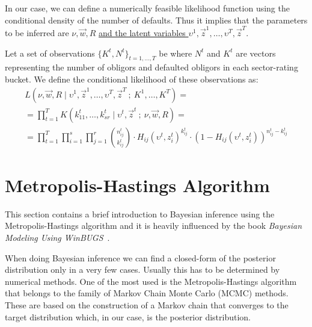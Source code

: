 \documentclass[11pt,fleqn]{book} %
\begin{document}
In our case, we can define a numerically feasible likelihood function using 
the conditional density of the number of defaults. Thus it implies that the 
parameters to be inferred are $\nu,\vec{w},R$ \ul{and the latent variables 
$\upsilon^1,\vec{z}^1,\dots,\upsilon^T,\vec{z}^T$}.

\begin{definition}
	Let a set of observations $\{K^t, N^t\}_{t=1,\dots,T}$ be where $N^t$ 
	and $K^t$ are vectors representing the number of obligors and defaulted 
	obligors in each sector-rating bucket. We define the conditional 
	likelihood of these observations as:
	\begin{displaymath}
		\begin{array}{l}
			L(\nu,\vec{w},R \mid \upsilon^1,\vec{z}^1,\dots,\upsilon^T,\vec{z}^T\ ;\ K^1,\dots,K^T) = \\
			= \displaystyle \prod_{t=1}^T K(k_{11}^t,\dots,k_{sr}^t \mid \upsilon^t,\vec{z}^t\ ;\ \nu,\vec{w},R) = \\
			= \displaystyle
			\prod_{t=1}^T \prod_{i=1}^s \prod_{j=1}^r 
			\binom{n_{ij}^t}{k_{ij}^t} \cdot
			H_{ij}(\upsilon^t,z_i^t)^{k_{ij}^t} \cdot
			\left( 1 - H_{ij}(\upsilon^t,z_i^t) \right)^{n_{ij}^t-k_{ij}^t}
		\end{array}
	\end{displaymath}
\end{definition}

\section{Metropolis-Hastings Algorithm}

This section contains a brief introduction to Bayesian inference using the 
Metropolis-Hastings algorithm and it is heavily influenced by the book 
\emph{Bayesian Modeling Using WinBUGS}~\cite{ntzoufras:2009}.

When doing Bayesian inference we can find a closed-form of the posterior 
distribution only in a very few cases. Usually this has to be determined 
by numerical methods. One of the most used is the Metropolis-Hastings 
algorithm that belongs to the family of Markov Chain Monte Carlo (MCMC) 
methods. These are based on the construction of a Markov chain that converges 
to the target distribution which, in our case, is the posterior distribution.
\end{document}
